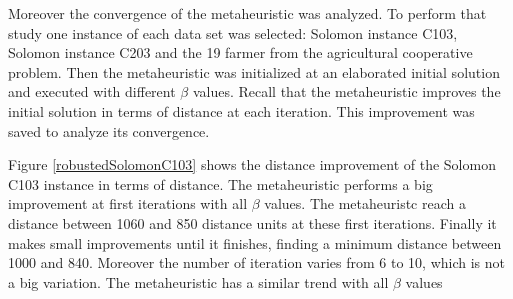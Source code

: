 Moreover the convergence of the metaheuristic was analyzed. To perform that study one instance of each data set was selected: Solomon instance C103, Solomon instance C203 and the 19 farmer from the agricultural cooperative problem. Then the metaheuristic was initialized at an elaborated initial solution and executed with different $\beta$ values. Recall that the metaheuristic improves the initial solution in terms of distance at each iteration. This improvement was saved to analyze its convergence. 


Figure \ref{robustedSolomonC103} shows the distance improvement of the Solomon C103 instance in terms of distance. The metaheuristic performs a big improvement at first iterations with all $\beta$ values. The metaheuristc reach a distance between 1060 and 850 distance units at these first iterations. Finally it makes small improvements until it finishes, finding a minimum distance between 1000 and 840. Moreover the number of iteration varies from 6 to 10, which is not a big variation. The metaheuristic has a similar trend with all $\beta$ values

